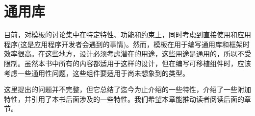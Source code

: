 \chapter{通用库}
目前，对模板的讨论集中在特定特性、功能和约束上，同时考虑到直接使用和应用程序(这是应用程序开发者会遇到的事情)。然而，模板在用于编写通用库和框架时效率很高。在这些地方，设计必须考虑潜在的用途，这些用途是通用的，所以不受限制。虽然本书中所有的内容都适用于这样的设计，但在编写可移植组件时，应该考虑一些通用性问题，这些组件要适用于尚未想象到的类型。

这里提出的问题并不完整，但它总结了迄今为止介绍的一些特性，介绍了一些附加特性，并引用了本书后面涉及的一些特性。我们希望本章能推动读者阅读后面的章节。







